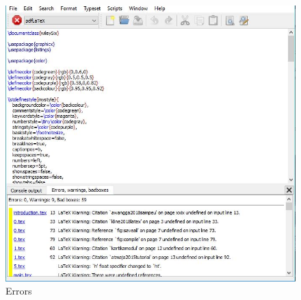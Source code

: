 \begin{enumerate}
\begin{figure}[!htbp]
  \centering
  \includegraphics[width=.75\textwidth]{figures/error.JPG}
  \caption{Errors}\label{fig:error}
\end{figure}
\end{enumerate}